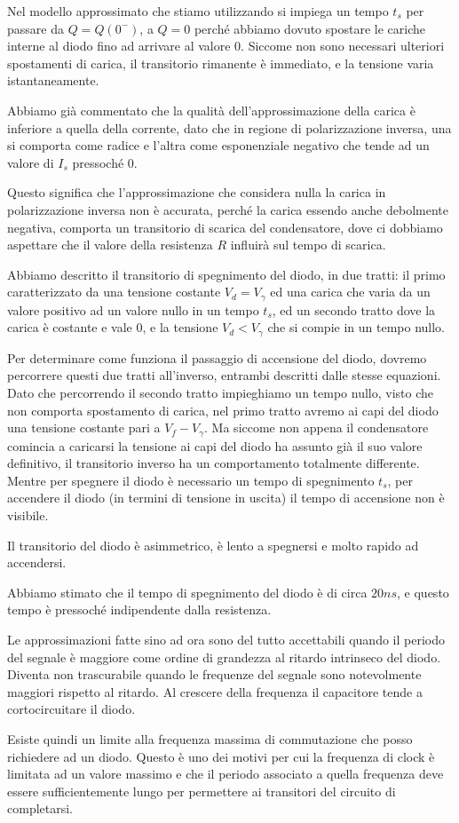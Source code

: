 \documentclass[../elettronica]{subfiles}
\begin{document}
Nel modello approssimato che stiamo utilizzando si impiega un tempo $t_s$ per passare da $Q = Q(0^-)$, a $Q = 0$
perché abbiamo dovuto spostare le cariche interne al diodo fino ad arrivare al valore 0.
Siccome non sono necessari ulteriori spostamenti di carica, il transitorio rimanente è immediato, e la tensione varia istantaneamente.

Abbiamo già commentato che la qualità dell'approssimazione della carica è inferiore a quella della corrente, dato
che in regione di polarizzazione inversa, una si comporta come radice e l'altra come esponenziale negativo che tende ad un
valore di $I_s$ pressoché 0.

Questo significa che l'approssimazione che considera nulla la carica in polarizzazione inversa non è accurata, perché la
carica essendo anche debolmente negativa, comporta un transitorio di scarica del condensatore, dove ci dobbiamo aspettare che
il valore della resistenza $R$ influirà sul tempo di scarica.

Abbiamo descritto il transitorio di spegnimento del diodo, in due tratti:
il primo caratterizzato da una tensione costante $V_d = V_\gamma$ ed una carica che varia da un valore positivo
ad un valore nullo in un tempo $t_s$, ed un secondo tratto dove la carica è costante e vale 0,
e la tensione $V_d < V_\gamma$ che si compie in un tempo nullo.

Per determinare come funziona il passaggio di accensione del diodo, dovremo percorrere questi due tratti
all'inverso, entrambi descritti dalle stesse equazioni.
Dato che percorrendo il secondo tratto impieghiamo un tempo nullo, visto che non comporta spostamento di carica,
nel primo tratto avremo ai capi del diodo una tensione costante pari a $V_f - V_\gamma$.
Ma siccome non appena il condensatore comincia a caricarsi la tensione ai capi del diodo ha assunto già il suo
valore definitivo, il transitorio inverso ha un comportamento totalmente differente.
Mentre per spegnere il diodo è necessario un tempo di spegnimento $t_s$, per accendere il diodo (in termini di
tensione in uscita) il tempo di accensione non è visibile.

Il transitorio del diodo è asimmetrico, è lento a spegnersi e molto rapido ad accendersi.

Abbiamo stimato che il tempo di spegnimento del diodo è di circa $20ns$, e questo tempo è pressoché indipendente
dalla resistenza.

Le approssimazioni fatte sino ad ora sono del tutto accettabili quando il periodo del segnale è maggiore come
ordine di grandezza al ritardo intrinseco del diodo. Diventa non trascurabile quando le frequenze del segnale
sono notevolmente maggiori rispetto al ritardo. Al crescere della frequenza il capacitore tende a cortocircuitare
il diodo.

Esiste quindi un limite alla frequenza massima di commutazione che posso richiedere ad un diodo.
Questo è uno dei motivi per cui la frequenza di clock è limitata ad un valore massimo e che il periodo associato a
quella frequenza deve essere sufficientemente lungo per permettere ai transitori del
circuito di completarsi.
\end{document}
